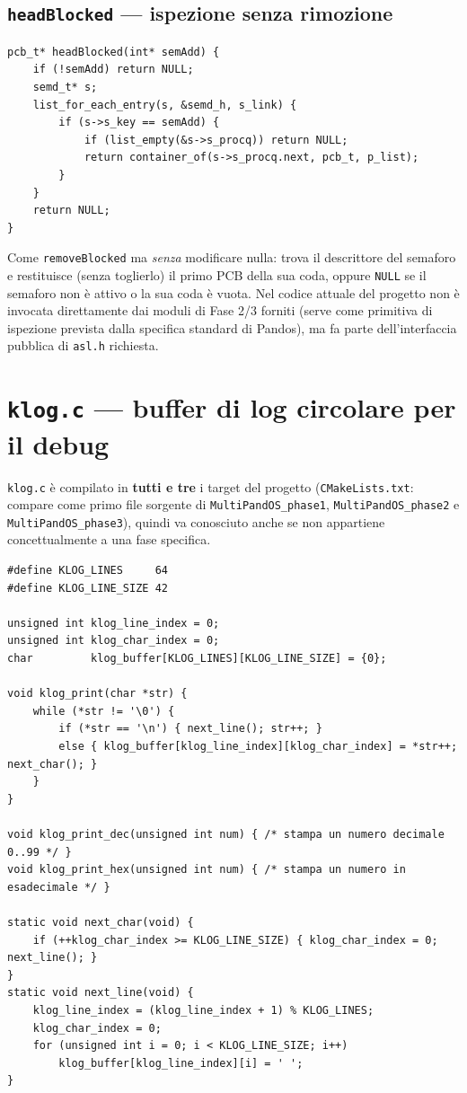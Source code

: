 \documentclass[11pt,a4paper]{article}
\newcommand{\code}[1]{\texttt{#1}}
\newcommand{\func}[1]{\textbf{\texttt{#1}}}
\begin{document}
\subsection{\func{headBlocked} --- ispezione senza rimozione}
\begin{lstlisting}
pcb_t* headBlocked(int* semAdd) {
    if (!semAdd) return NULL;
    semd_t* s;
    list_for_each_entry(s, &semd_h, s_link) {
        if (s->s_key == semAdd) {
            if (list_empty(&s->s_procq)) return NULL;
            return container_of(s->s_procq.next, pcb_t, p_list);
        }
    }
    return NULL;
}
\end{lstlisting}
Come \code{removeBlocked} ma \emph{senza} modificare nulla: trova il
descrittore del semaforo e restituisce (senza toglierlo) il primo PCB della
sua coda, oppure \code{NULL} se il semaforo non è attivo o la sua coda è
vuota. Nel codice attuale del progetto non è invocata direttamente dai
moduli di Fase 2/3 forniti (serve come primitiva di ispezione prevista dalla
specifica standard di Pandos), ma fa parte dell'interfaccia pubblica di
\code{asl.h} richiesta.

\section{\code{klog.c} --- buffer di log circolare per il debug}

\code{klog.c} è compilato in \textbf{tutti e tre} i target del progetto
(\code{CMakeLists.txt}: compare come primo file sorgente di
\code{MultiPandOS\_phase1}, \code{MultiPandOS\_phase2} e
\code{MultiPandOS\_phase3}), quindi va conosciuto anche se non appartiene
concettualmente a una fase specifica.

\begin{lstlisting}
#define KLOG_LINES     64
#define KLOG_LINE_SIZE 42

unsigned int klog_line_index = 0;
unsigned int klog_char_index = 0;
char         klog_buffer[KLOG_LINES][KLOG_LINE_SIZE] = {0};

void klog_print(char *str) {
    while (*str != '\0') {
        if (*str == '\n') { next_line(); str++; }
        else { klog_buffer[klog_line_index][klog_char_index] = *str++; next_char(); }
    }
}

void klog_print_dec(unsigned int num) { /* stampa un numero decimale 0..99 */ }
void klog_print_hex(unsigned int num) { /* stampa un numero in esadecimale */ }

static void next_char(void) {
    if (++klog_char_index >= KLOG_LINE_SIZE) { klog_char_index = 0; next_line(); }
}
static void next_line(void) {
    klog_line_index = (klog_line_index + 1) % KLOG_LINES;
    klog_char_index = 0;
    for (unsigned int i = 0; i < KLOG_LINE_SIZE; i++)
        klog_buffer[klog_line_index][i] = ' ';
}
\end{lstlisting}
\end{document}
